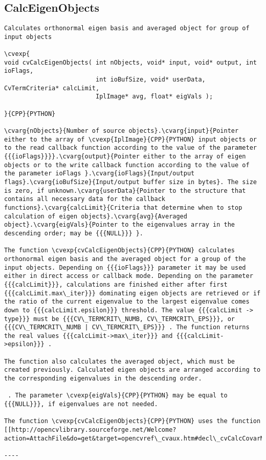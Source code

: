 \subsection{CalcEigenObjects}
\begin{verbatim}
Calculates orthonormal eigen basis and averaged object for group of input objects

\cvexp{
void cvCalcEigenObjects( int nObjects, void* input, void* output, int ioFlags,
                         int ioBufSize, void* userData, CvTermCriteria* calcLimit,
                         IplImage* avg, float* eigVals );

}{CPP}{PYTHON}

\cvarg{nObjects}{Number of source objects}.\cvarg{input}{Pointer either to the array of \cvexp{IplImage}{CPP}{PYTHON} input objects or to the read callback function according to the value of the parameter {{{ioFlags}}}}.\cvarg{output}{Pointer either to the array of eigen objects or to the write callback function according to the value of the parameter ioFlags }.\cvarg{ioFlags}{Input/output flags}.\cvarg{ioBufSize}{Input/output buffer size in bytes}. The size is zero, if unknown.\cvarg{userData}{Pointer to the structure that contains all necessary data for the callback functions}.\cvarg{calcLimit}{Criteria that determine when to stop calculation of eigen objects}.\cvarg{avg}{Averaged object}.\cvarg{eigVals}{Pointer to the eigenvalues array in the descending order; may be {{{NULL}}} }.

The function \cvexp{cvCalcEigenObjects}{CPP}{PYTHON} calculates orthonormal eigen basis and the averaged object for a group of the input objects. Depending on {{{ioFlags}}} parameter it may be used either in direct access or callback mode. Depending on the parameter {{{calcLimit}}}, calculations are finished either after first {{{calcLimit.max\_iter}}} dominating eigen objects are retrieved or if the ratio of the current eigenvalue to the largest eigenvalue comes down to {{{calcLimit.epsilon}}} threshold. The value {{{calcLimit -> type}}} must be {{{CV\_TERMCRIT\_NUMB, CV\_TERMCRIT\_EPS}}}, or {{{CV\_TERMCRIT\_NUMB | CV\_TERMCRIT\_EPS}}} . The function returns the real values {{{calcLimit->max\_iter}}} and {{{calcLimit->epsilon}}} .

The function also calculates the averaged object, which must be created previously. Calculated eigen objects are arranged according to the corresponding eigenvalues in the descending order.

 . The parameter \cvexp{eigVals}{CPP}{PYTHON} may be equal to {{{NULL}}}, if eigenvalues are not needed.

The function \cvexp{cvCalcEigenObjects}{CPP}{PYTHON} uses the function [[http://opencvlibrary.sourceforge.net/Welcome?action=AttachFile&do=get&target=opencvref\_cvaux.htm#decl\_cvCalcCovarMatrixEx|cvCalcCovarMatrixEx]].

----
\end{verbatim}
